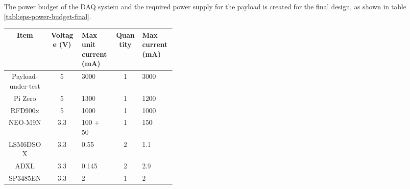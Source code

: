 \documentclass[]{report}
\begin{document}
The power budget of the DAQ system and the required power supply for the payload is created for the final design, as shown in table \ref{tabl:eps-power-budget-final}.

\begin{table}[H]
  \centering
  \begin{tabular}{|c|c|L{0.2\linewidth}|c|L{0.2\linewidth}|}
    \hline
    \textbf{Item}                    & \textbf{Voltage (\si{\volt})} & \textbf{Max unit current (\si{\milli\ampere})} & \textbf{Quantity} & \textbf{Max current (\si{\milli\ampere})} \\
    \hline
    Payload-under-test               & 5                             & 3000                                           & 1                 & 3000                                      \\
    Pi Zero                          & 5                             & 1300 \cite{raspberry-pi-hardware-doc}          & 1                 & 1200                                      \\
    RFD900x                          & 5                             & 1000 \cite{rfdesign2020rfd900x}                & 1                 & 1000                                      \\
    NEO-M9N                          & 3.3                           & 100 + 50 \cite{ublox2023neo_m9n_datasheet}     & 1                 & 150                                       \\
    LSM6\-DSOX                       & 3.3                           & 0.55 \cite{lsm6dso-datasheet}                  & 2                 & 1.1                                       \\
    ADXL                        & 3.3                           & 0.145 \cite{analog2014adxl375}                 & 2                 & 2.9                                       \\
    SP3485EN                         & 3.3                           & 2 \cite{maxlinear2021sp3485}                   & 1                 & 2                                         \\

\end{tabular}
\end{table}
\end{document}
